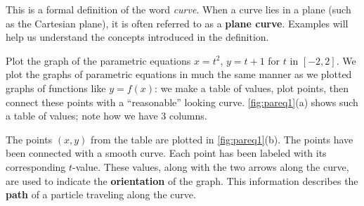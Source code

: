
This is a formal definition of the word \emph{curve}. When a curve lies in a plane (such as the Cartesian plane), it is often referred to as a \textbf{plane curve}. Examples will help us understand the concepts introduced in the definition.


\begin{example}\label{ex_pareq1}
Plot the graph of the parametric equations $x=t^2$, $y=t+1$ for $t$ in $[-2,2]$.
\solution
We plot the graphs of parametric equations in much the same manner as we plotted graphs of functions like $y=f(x)$: we make a table of values, plot points, then connect these points with a ``reasonable'' looking curve. \autoref{fig:pareq1}(a) shows such a table of values; note how we have 3 columns.

The points $(x,y)$ from the table are plotted in \autoref{fig:pareq1}(b). The points have been connected with a smooth curve. Each point has been labeled with its corresponding $t$-value. These values, along with the two arrows along the curve, are used to indicate the \textbf{orientation} of the graph. This information describes the \textbf{path} of a particle traveling along the curve.
\end{example}

